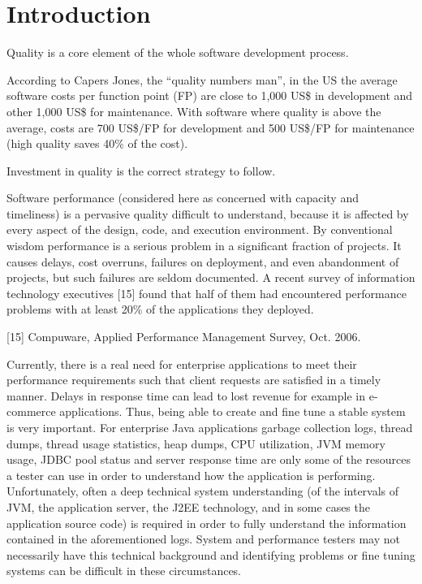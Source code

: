 \documentclass[runningheads,a4paper]{llncs}
\begin{document}
\section{Introduction}

Quality is a core element of the whole software development process.

According to Capers Jones, the “quality numbers man”, in the US the average
software costs per function point (FP) are close to 1,000 US\$ in development and other 1,000 US\$ for maintenance. With
software where quality is above the average, costs are 700 US\$/FP for
development and 500 US\$/FP for maintenance (high quality saves 40\% of the
cost).

Investment in quality is the correct strategy to follow. 

Software performance (considered here as
concerned with capacity and timeliness) is a pervasive
quality difficult to understand, because it is affected by
every aspect of the design, code, and execution
environment. By conventional wisdom performance is
a serious problem in a significant fraction of projects.
It causes delays, cost overruns, failures on deployment,
and even abandonment of projects, but such failures
are seldom documented. A recent survey of
information technology executives [15] found that half
of them had encountered performance problems with at
least 20\% of the applications they deployed.

[15] Compuware, Applied Performance Management Survey, Oct. 2006.




Currently, there is a real need for enterprise applications to meet their 
performance requirements such that client requests are satisfied in a timely
manner. Delays in response time can lead to lost revenue for example in
e-commerce applications. Thus, being able to create and fine tune a stable
system is very important. For enterprise Java applications garbage collection logs, 
thread dumps, thread usage statistics, heap dumps, CPU utilization, JVM memory usage, 
JDBC pool status and server response time are only some of the resources a tester can use 
in order to understand how the application is performing. Unfortunately, often a deep 
technical system understanding (of the intervals of JVM, the application server, the 
J2EE technology, and in some cases the application source code) is required in order to 
fully understand the information contained in the aforementioned logs. System and 
performance testers may not necessarily have this technical background and identifying 
problems or fine tuning systems can be difficult in these circumstances.
\end{document}
